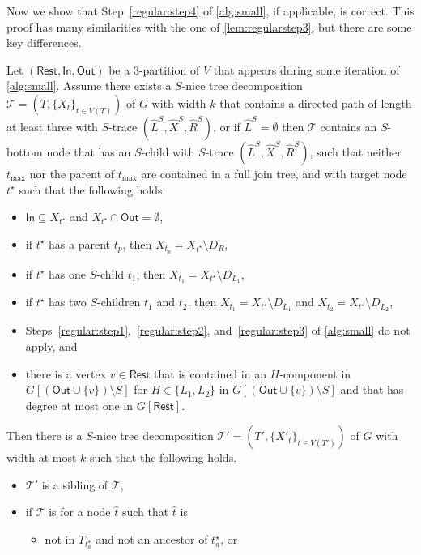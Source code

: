 \documentclass[a4paper,UKenglish,cleveref, autoref, thm-restate, numberwithinsect]{lipics-v2021}
\newcommand{\slim}{\text{slim}\xspace}
\newcommand{\topheavy}{\text{top-heavy}\xspace}
\newcommand{\In}{\mathsf{In}}
\newcommand{\Out}{\mathsf{Out}}
\newcommand{\Rest}{\mathsf{Rest}}
\begin{document}
Now we show that Step~\ref{regular:step4} of \cref{alg:small}, if applicable, is correct. This proof has many similarities with the one of \cref{lem:regularstep3}, but there are some key differences.

\begin{lemma}\label{lem:regularstep4}
Let $(\Rest,\In,\Out)$ be a 3-partition of $V$ that appears during some iteration of \cref{alg:small}. 
Assume there exists a \slim $S$-nice tree decomposition $\mathcal{T}=(T,\{X_t\}_{t\in V(T)})$ of $G$ with width $k$ that contains a directed path of length at least three with $S$-trace $(\hat{L}^S, \hat{X}^S, \hat{R}^S)$, or if $\hat{L}^S=\emptyset$ then $\mathcal{T}$ contains an $S$-bottom node that has an $S$-child with $S$-trace $(\hat{L}^S, \hat{X}^S, \hat{R}^S)$, such that neither $t_{\max}$ nor the parent of $t_{\max}$ are contained in a full join tree, and with target node ${t^\star}$ such that the following holds.
\begin{itemize}
\item $\In\subseteq X_{t^\star}$ and $X_{t^\star}\cap \Out=\emptyset$,
            \item if $t^\star$ has a parent $t_p$, then $X_{t_p}=X_{t^\star}\setminus D_R$, 
    \item if $t^\star$ has one $S$-child $t_1$, then $X_{t_1}=X_{t^\star}\setminus D_{L_1}$, 
    \item if $t^\star$ has two $S$-children $t_1$ and $t_2$, then $X_{t_1}=X_{t^\star}\setminus D_{L_1}$ and $X_{t_2}=X_{t^\star}\setminus D_{L_2}$, 
    \item Steps~\ref{regular:step1},~\ref{regular:step2}, and~\ref{regular:step3} of \cref{alg:small} do not apply, and
    \item there is a vertex $v\in\Rest$ that is contained in an $H$-component in $G[(\Out\cup\{v\})\setminus S]$ for $H\in\{L_1,L_2\}$ in $G[(\Out\cup\{v\})\setminus S]$ and that has degree at most one in $G[\Rest]$.
\end{itemize} 
Then there is a \slim $S$-nice tree decomposition $\mathcal{T}'=(T',\{X'_t\}_{t\in V(T')})$ of $G$ with width at most $k$ 
such that the following holds.
\begin{itemize}
\item $\mathcal{T}'$ is a sibling of $\mathcal{T}$,
\item if $\mathcal{T}$ is \topheavy for a node $\hat{t}$ such that $\hat{t}$ is
\begin{itemize}
    \item not in $T_{t^\star_a}$ and not an ancestor of $t^\star_a$, or

\end{itemize}
\end{itemize}
\end{lemma}
\end{document}
